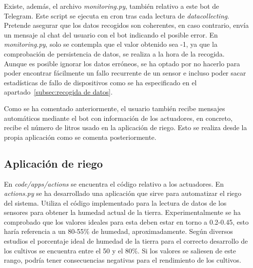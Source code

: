\documentclass[a4paper, 12pt, oneside]{book}
\begin{document}
Existe, además, el archivo \textit{monitoring.py}, también relativo a este bot de Telegram. Este script se ejecuta en cron tras cada lectura de \textit{datacollecting}. Pretende asegurar que los datos recogidos son coherentes, en caso contrario, envía un mensaje al chat del usuario con el bot indicando el posible error. En \textit{monitoring.py}, solo se contempla que el valor obtenido sea -1, ya que la comprobación de persistencia de datos, se realiza a la hora de la recogida. Aunque es posible ignorar los datos erróneos, se ha optado por no hacerlo para poder encontrar fácilmente un fallo recurrente de un sensor e incluso poder sacar estadísticas de fallo de dispositivos como se ha especificado en el apartado~\ref{subsec:recogida de datos}.

Como se ha comentado anteriormente, el usuario también recibe mensajes automáticos mediante el bot con información de los actuadores, en concreto, recibe el número de litros usado en la aplicación de riego. Esto se realiza desde la propia aplicación como se comenta posteriormente.




\subsection{Aplicación de riego}
\label{subsec:riego}
En \textit{code/apps/actions} se encuentra el código relativo a los actuadores. En \textit{actions.py} se ha desarrollado una aplicación que sirve para automatizar el riego del sistema. Utiliza el código implementado para la lectura de datos de los sensores para obtener la humedad actual de la tierra. Experimentalmente se ha comprobado que los valores ideales para esta deben estar en torno a 0.2-0.45, esto haría referencia a un 80-55\% de humedad, aproximadamente. Según diversos estudios\cite{cultivos_humedad} el porcentaje ideal de humedad de la tierra para el correcto desarrollo de los cultivos se encuentra entre el 50 y el 80\%. Si los valores se saliesen de este rango, podría tener consecuencias negativas para el rendimiento de los cultivos. 
\end{document}
